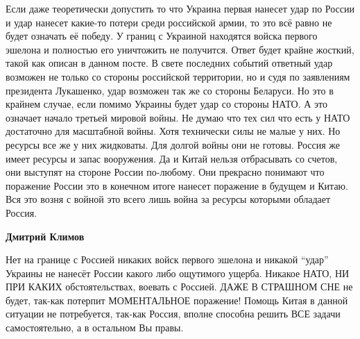 \begin{itemize}
Если даже теоретически допустить то что Украина первая нанесет удар по России и
удар нанесет какие-то потери среди российской армии, то это всё равно не будет
означать её победу. У границ с Украиной находятся войска первого эшелона и
полностью его уничтожить не получится. Ответ будет крайне жосткий, такой как
описан в данном посте. В свете последних событий ответный удар возможен не
только со стороны российской территории, но и судя по заявлениям президента
Лукашенко, удар возможен так же со стороны Беларуси. Но это в крайнем случае,
если помимо Украины будет удар со стороны НАТО. А это означает начало третьей
мировой войны. Не думаю что тех сил что есть у НАТО достаточно для масштабной
войны. Хотя технически силы не малые у них. Но ресурсы все же у них жидковаты.
Для долгой войны они не готовы. Россия же имеет ресурсы и запас вооружения. Да
и Китай нельзя отбрасывать со счетов, они выступят на стороне России по-любому.
Они прекрасно понимают что поражение России это в конечном итоге нанесет
поражение в будущем и Китаю. Вся это возня с войной это всего лишь война за
ресурсы которыми обладает Россия.

\begin{itemize} %
\textbf{Дмитрий Климов} 

Нет на границе с Россией никаких войск первого эшелона
и никакой \enquote{удар} Украины не нанесёт России какого либо ощутимого ущерба.
Никакое НАТО, НИ ПРИ КАКИХ обстоятельствах, воевать с Россией. ДАЖЕ В СТРАШНОМ
СНЕ не будет, так-как потерпит МОМЕНТАЛЬНОЕ поражение! Помощь Китая в данной
ситуации не потребуется, так-как Россия, вполне способна решить ВСЕ задачи
самостоятельно, а в остальном Вы правы.
\end{itemize} %


\end{itemize} %
